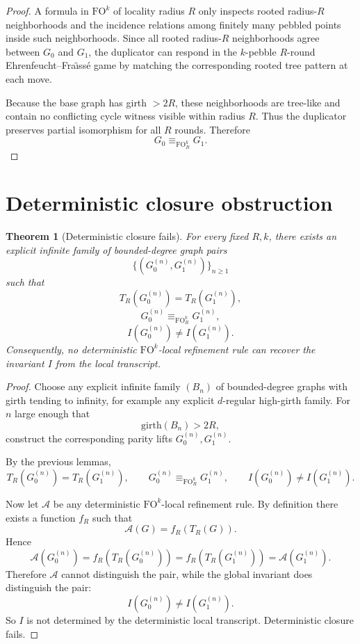 \documentclass[11pt]{article}
\newtheorem{theorem}{Theorem}
\begin{document}
\begin{proof}
A formula in \(\mathrm{FO}^k\) of locality radius \(R\) only inspects rooted radius-\(R\) neighborhoods and the incidence relations among finitely many pebbled points inside such neighborhoods. Since all rooted radius-\(R\) neighborhoods agree between \(G_0\) and \(G_1\), the duplicator can respond in the \(k\)-pebble \(R\)-round Ehrenfeucht--Fra\"\i ss\'e game by matching the corresponding rooted tree pattern at each move.

Because the base graph has girth \(>2R\), these neighborhoods are tree-like and contain no conflicting cycle witness visible within radius \(R\). Thus the duplicator preserves partial isomorphism for all \(R\) rounds. Therefore
\[
G_0\equiv_{\mathrm{FO}^k_R} G_1.
\]
\end{proof}

\section{Deterministic closure obstruction}

\begin{theorem}[Deterministic closure fails]
For every fixed \(R,k\), there exists an explicit infinite family of bounded-degree graph pairs
\[
\{(G_0^{(n)},G_1^{(n)})\}_{n\ge 1}
\]
such that
\[
T_R(G_0^{(n)})=T_R(G_1^{(n)}),
\]
\[
G_0^{(n)}\equiv_{\mathrm{FO}^k_R} G_1^{(n)},
\]
\[
I(G_0^{(n)})\neq I(G_1^{(n)}).
\]
Consequently, no deterministic \(\mathrm{FO}^k\)-local refinement rule can recover the invariant \(I\) from the local transcript.
\end{theorem}

\begin{proof}
Choose any explicit infinite family \((B_n)\) of bounded-degree graphs with girth tending to infinity, for example any explicit \(d\)-regular high-girth family. For \(n\) large enough that
\[
\mathrm{girth}(B_n)>2R,
\]
construct the corresponding parity lifts \(G_0^{(n)},G_1^{(n)}\).

By the previous lemmas,
\[
T_R(G_0^{(n)})=T_R(G_1^{(n)}),
\qquad
G_0^{(n)}\equiv_{\mathrm{FO}^k_R} G_1^{(n)},
\qquad
I(G_0^{(n)})\neq I(G_1^{(n)}).
\]

Now let \(\mathcal A\) be any deterministic \(\mathrm{FO}^k\)-local refinement rule. By definition there exists a function \(f_R\) such that
\[
\mathcal A(G)=f_R(T_R(G)).
\]
Hence
\[
\mathcal A(G_0^{(n)})=f_R(T_R(G_0^{(n)}))=f_R(T_R(G_1^{(n)}))=\mathcal A(G_1^{(n)}).
\]
Therefore \(\mathcal A\) cannot distinguish the pair, while the global invariant does distinguish the pair:
\[
I(G_0^{(n)})\neq I(G_1^{(n)}).
\]
So \(I\) is not determined by the deterministic local transcript. Deterministic closure fails.
\end{proof}
\end{document}
